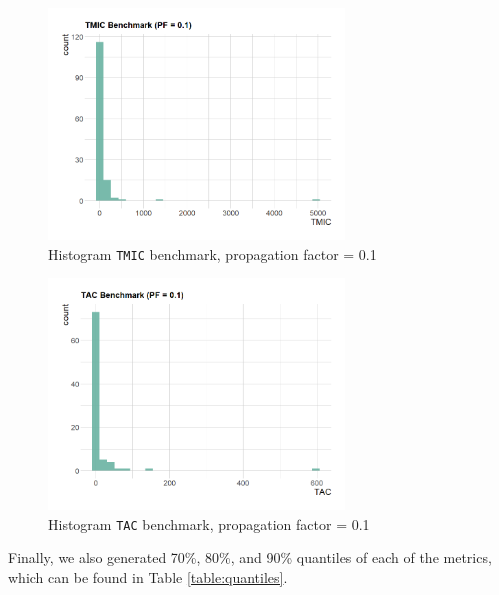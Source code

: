 \begin{figure}[ht!]
\begin{center}
  \includegraphics[width=0.7\textwidth]{figures/benchmark/TMIC_PF_0.1.png}
  \caption{Histogram \texttt{TMIC} benchmark, propagation factor = 0.1}
  \label{fig:TMIC-benchmark-0.1}
\end{center}
\end{figure}

\begin{figure}[ht!]
\begin{center}
\includegraphics[width=0.7\textwidth]{figures/benchmark/TAC_PF_0.1.png}
\caption{Histogram \texttt{TAC} benchmark, propagation factor = 0.1}
\label{fig:TAC-benchmark-0.1}
\end{center}
\end{figure}

Finally, we also generated 70\%, 80\%, and 90\% quantiles of each of the metrics, which can be found in Table \ref{table:quantiles}.

